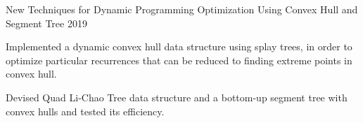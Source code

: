 \begin{cventries}
  \cventry
    {New Techniques for Dynamic Programming Optimization Using Convex Hull and Segment Tree} %
    {2019} %
    {
      \begin{cvitems} %
        \item {Implemented a dynamic convex hull data structure using splay trees, in order to optimize particular recurrences that can be reduced to finding extreme points in convex hull. }
        \item {Devised Quad Li-Chao Tree data structure and a bottom-up segment tree with convex hulls and tested its efficiency.}
      \end{cvitems}
    }
    
    
    


\end{cventries}

